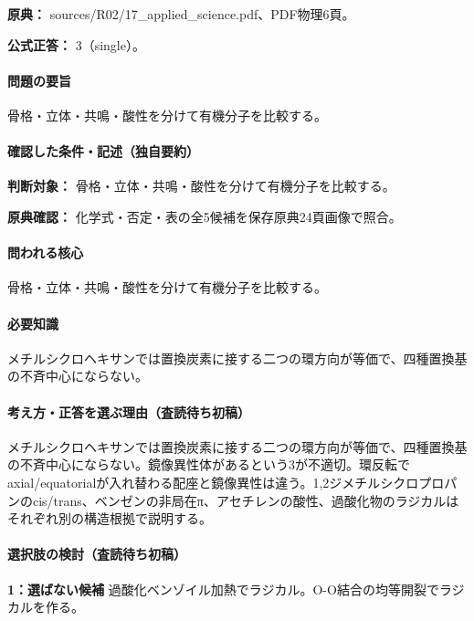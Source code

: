 \noindent\textbf{原典：} sources/R02/17\_applied\_science.pdf、PDF物理6頁。

\textbf{公式正答：} 3（single）。

\paragraph{問題の要旨} 骨格・立体・共鳴・酸性を分けて有機分子を比較する。

\paragraph{確認した条件・記述（独自要約）}\mbox{}\par

\noindent\textbf{判断対象：} 骨格・立体・共鳴・酸性を分けて有機分子を比較する。\par

\noindent\textbf{原典確認：} 化学式・否定・表の全5候補を保存原典24頁画像で照合。\par

\paragraph{問われる核心} 骨格・立体・共鳴・酸性を分けて有機分子を比較する。

\paragraph{必要知識} メチルシクロヘキサンでは置換炭素に接する二つの環方向が等価で、四種置換基の不斉中心にならない。

\paragraph{考え方・正答を選ぶ理由（査読待ち初稿）} メチルシクロヘキサンでは置換炭素に接する二つの環方向が等価で、四種置換基の不斉中心にならない。鏡像異性体があるという3が不適切。環反転でaxial/equatorialが入れ替わる配座と鏡像異性は違う。1,2ジメチルシクロプロパンのcis/trans、ベンゼンの非局在π、アセチレンの酸性、過酸化物のラジカルはそれぞれ別の構造根拠で説明する。

\paragraph{選択肢の検討（査読待ち初稿）}\mbox{}\par

\noindent\textbf{1：選ばない候補} 過酸化ベンゾイル加熱でラジカル。O-O結合の均等開裂でラジカルを作る。\par

